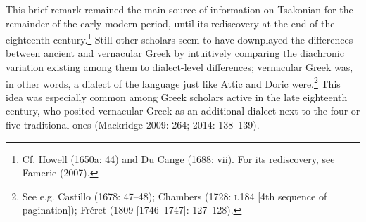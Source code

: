 \documentclass[12pt]{article}
\newenvironment{styleStandard}{\renewcommand\baselinestretch{1.25}\setlength\leftskip{0in}\setlength\rightskip{0in}\setlength\parindent{0.1972in}\setlength\parfillskip{0pt plus 1fil}\setlength\parskip{0in plus 1pt}\writerlistparindent\writerlistleftskip\leavevmode\normalfont\normalsize\writerlistlabel\ignorespaces}{\unskip\vspace{0in plus 1pt}\par}
\newcommand\writerlistleftskip{}
\newcommand\writerlistparindent{}
\newcommand\writerlistlabel{}
\begin{document}
\begin{styleStandard}
This brief remark remained the main source of information on Tsakonian for the remainder of the early modern period, until its rediscovery at the end of the eighteenth century.\footnote{ Cf. Howell (1650a: 44) and Du Cange (1688: vii). For its rediscovery, see Famerie (2007).} Still other scholars seem to have downplayed the differences between ancient and vernacular Greek by intuitively comparing the diachronic variation existing among them to dialect-level differences; vernacular Greek was, in other words, a dialect of the language just like Attic and Doric were.\footnote{ See e.g. Castillo (1678: 47–48); Chambers (1728: \textsc{i.}184 [4th sequence of pagination]); Fréret (1809 [1746–1747]: 127–128).} This idea was especially common among Greek scholars active in the late eighteenth century, who posited vernacular Greek as an additional dialect next to the four or five traditional ones (Mackridge 2009: 264; 2014: 138–139).
\end{styleStandard}
\end{document}
